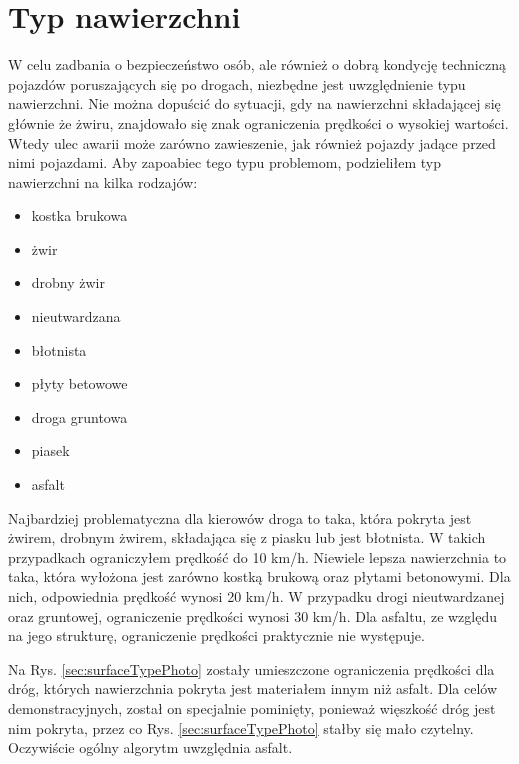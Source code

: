 \newpage
\section{Typ nawierzchni}
\label{sec:surfaceType}

W celu zadbania o bezpieczeństwo osób, ale również o dobrą kondycję techniczną pojazdów poruszających się po drogach, niezbędne jest uwzględnienie typu nawierzchni. Nie można dopuścić do sytuacji, gdy na nawierzchni składającej się głównie że żwiru, znajdowało się znak ograniczenia prędkości o wysokiej wartości. Wtedy ulec awarii może zarówno zawieszenie, jak również pojazdy jadące przed nimi pojazdami. Aby zapoabiec tego typu problemom, podzieliłem typ nawierzchni na kilka rodzajów:

\begin{itemize}
\item kostka brukowa
\item żwir
\item drobny żwir
\item nieutwardzana
\item błotnista
\item płyty  betowowe
\item droga gruntowa
\item piasek
\item asfalt
\end{itemize}

Najbardziej problematyczna dla kierowów droga to taka, która pokryta jest żwirem, drobnym żwirem, składająca się z piasku lub jest błotnista. W takich przypadkach ograniczyłem prędkość do 10 km/h. Niewiele lepsza nawierzchnia to taka, która wyłożona jest zarówno kostką brukową oraz płytami betonowymi. Dla nich, odpowiednia prędkość wynosi 20 km/h. W przypadku drogi nieutwardzanej oraz gruntowej, ograniczenie prędkości wynosi 30 km/h. Dla asfaltu, ze względu na jego strukturę, ograniczenie prędkości praktycznie nie występuje.

Na Rys. \ref{sec:surfaceTypePhoto} zostały umieszczone ograniczenia prędkości dla dróg, których nawierzchnia pokryta jest materiałem innym niż asfalt. Dla celów demonstracyjnych, został on specjalnie pominięty, ponieważ więszkość dróg jest nim pokryta, przez co Rys. \ref{sec:surfaceTypePhoto} stałby się mało czytelny. Oczywiście ogólny algorytm uwzględnia asfalt.

